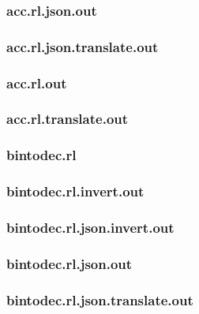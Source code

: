 \subsubsection{acc.rl.json.out}
\label{app:acc_rl.json.out}

\subsubsection{acc.rl.json.translate.out}
\label{app:acc_rl.json.translate.out}

\subsubsection{acc.rl.out}
\label{app:acc_rl.out}

\subsubsection{acc.rl.translate.out}
\label{app:acc_rl.translate.out}

\subsubsection{bintodec.rl}
\label{app:bintodec_rl}

\subsubsection{bintodec.rl.invert.out}
\label{app:bintodec_rl.invert.out}

\subsubsection{bintodec.rl.json.invert.out}
\label{app:bintodec_rl.json.invert.out}

\subsubsection{bintodec.rl.json.out}
\label{app:bintodec_rl.json.out}

\subsubsection{bintodec.rl.json.translate.out}
\label{app:bintodec_rl.json.translate.out}

